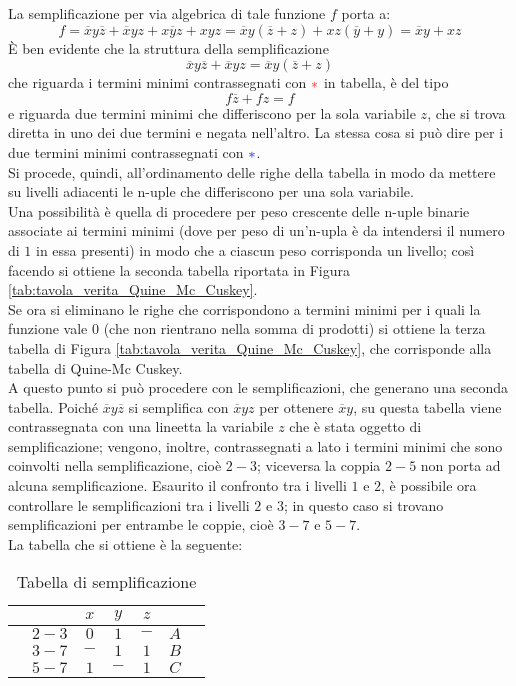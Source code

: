 \documentclass[a4paper]{extarticle}
\renewcommand\arraystretch{}
\begin{document}
\noindent
La semplificazione per via algebrica di tale funzione $f$ porta a:
\[f = \overline{x}y\overline{z} + \overline{x}yz + x\overline{y}z + xyz = \overline{x}y(\overline{z} + z) + xz(\overline{y} + y) = \overline{x}y + xz\]
È ben evidente che la struttura della semplificazione
\[\overline{x}y\overline{z} + \overline{x}yz = \overline{x}y(\overline{z} + z)\]
che riguarda i termini minimi contrassegnati con $\color{red}{\ast}$ in tabella, è del tipo
\[f\overline{z} + fz = f\]
e riguarda due termini minimi che differiscono per la sola variabile \(z\), che si trova diretta in uno dei due termini e negata nell'altro. La stessa cosa si può dire per i due termini minimi contrassegnati con $\color{blue}{\ast}$.\\
Si procede, quindi, all'ordinamento delle righe della tabella in modo da mettere su livelli adiacenti le n-uple che differiscono per una sola variabile.\\
Una possibilità è quella di procedere per peso crescente delle n-uple binarie associate ai termini minimi (dove per peso di un'n-upla è da intendersi il numero di $1$ in essa presenti) in modo che a ciascun peso corrisponda un livello; così facendo si ottiene la seconda tabella riportata in Figura \ref{tab:tavola_verita_Quine_Mc_Cuskey}.\\
Se ora si eliminano le righe che corrispondono a termini minimi per i quali la funzione vale $0$ (che non rientrano nella somma di prodotti) si ottiene la terza tabella di Figura \ref{tab:tavola_verita_Quine_Mc_Cuskey}, che corrisponde alla tabella di Quine-Mc Cuskey.\\
A questo punto si può procedere con le semplificazioni, che generano una seconda tabella. Poiché \(\overline{x} y \overline{z}\) si semplifica con \(\overline{x}yz\) per ottenere \(\overline{x}y\), su questa tabella viene contrassegnata con una lineetta la variabile \(z\) che è stata oggetto di semplificazione; vengono, inoltre, contrassegnati a lato i termini minimi che sono coinvolti nella semplificazione, cioè \(2 - 3\); viceversa la coppia \(2 - 5\) non porta ad alcuna semplificazione. Esaurito il confronto tra i livelli \(1\) e \(2\), è possibile ora controllare le semplificazioni tra i livelli \(2\) e \(3\); in questo caso si trovano semplificazioni per entrambe le coppie, cioè \(3 - 7\) e \(5 - 7\).\\
La tabella che si ottiene è la seguente:

\begin{table}[H]
    \centering
    \setlength{\tabcolsep}{8pt}
    \renewcommand{\arraystretch}{1.2}
    \begin{tabular}{c|c|ccc|cc}
         & $ $ & $x$ & $y$ & $z$ & $ $ & \\
         \hline
         & $2 - 3$ & $0$ & $1$ & $-$ & $A$ & \\
         \hline
         & $3 - 7$ & $-$ & $1$ & $1$ & $B$ & \\
         & $5 - 7$ & $1$ & $-$ & $1$ & $C$ & \\
    \end{tabular}
    \caption{Tabella di semplificazione}
    \label{tab:semplificazione_quine_mc_cuskey_0}
\end{table}
\end{document}
